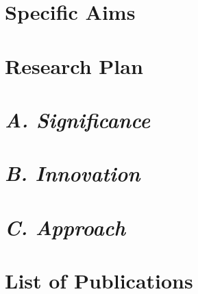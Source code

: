 \documentclass[11pt,notitlepage]{article}
\begin{document}

\newpage	
\tableofcontents
\newpage
\section{Specific Aims}

\newpage
\section{Research Plan}
\vspace{1cm}
\section{\textbf{\textit{A. Significance}}}
\vspace{1cm}

\newpage
\section{\textbf{\textit{B. Innovation}}}
\vspace{1cm}

\newpage
\section{\textbf{\textit{C. Approach}}}
\vspace{1cm}

\newpage

\newpage

\newpage

\newpage

\newpage
\section{List of Publications}

\newpage

\small{}
\end{document}
